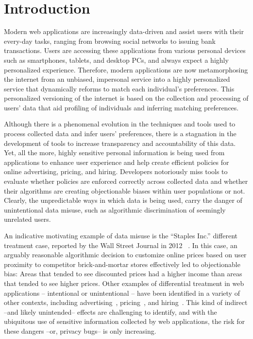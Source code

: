 
\section{Introduction}

Modern web applications are increasingly data-driven and assist users
with their every-day tasks, ranging from browsing social networks to
issuing bank transactions. Users are accessing these applications from
various personal devices such as smartphones, tablets, and desktop PCs,
and always expect a highly personalized experience. Therefore, modern
applications are now metamorphosing the internet from an unbiased, impersonal
service into a highly personalized service that dynamically reforms to match
each individual's preferences. This personalized versioning of the internet
is based on the collection and processing of users' data that aid profiling
of individuals and inferring matching preferences.

Although there is a phenomenal evolution in the techniques and tools used to
process collected data and infer users' preferences, there is a stagnation
in the development of tools to increase transparency and accountability of
this data. Yet, all the more,  highly sensitive personal information is being
used from applications to enhance user experience and help create efficient
policies for online advertising, pricing, and hiring.
Developers notoriously miss tools to evaluate whether policies are
enforced correctly across collected data and whether their algorithms are
creating objectionable biases within user populations or not. Clearly,
the unpredictable ways in which data is being used, carry the danger of
unintentional data misuse, such as algorithmic discrimination of seemingly
unrelated users.

An indicative motivating example of data misuse is the ``Staples Inc.''
different treatment case, reported by the Wall Street Journal in 2012
~\cite{Staples}. In this case, an arguably reasonable algorithmic decision
to customize online prices based on user proximity to competitor
brick-and-mortar stores effectively led to objectionable bias:
Areas that tended to see discounted prices had a higher income than areas
that tended to see higher prices. Other examples of differential treatment in
web applications – intentional or unintentional – have been identified in a
variety of other contexts, including
advertising~\cite{Sweeney:AdDiscrimination},
pricing~\cite{Hannak:PriceDiscrimination}, and
hiring~\cite{acquisiti:HiringDiscrimination}. This kind of indirect --and likely
unintended-- effects are challenging to identify, and with the ubiquitous use
of sensitive information collected by web applications, the risk for these
dangers --or, privacy bugs-- is only increasing.

